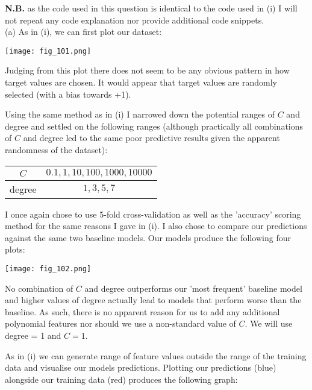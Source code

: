 \documentclass[12pt]{article}
\begin{document}
\textbf{N.B.} as the code used in this question is identical to the code used in (i) I will not repeat any code explanation nor provide additional code snippets. \\

\noindent (a) As in (i), we can first plot our dataset:

\begin{center}
    \texttt{[image: fig\_101.png]}
\end{center}

Judging from this plot there does not seem to be any obvious pattern in how target values are chosen. It would appear that target values are randomly selected (with a bias towards +1).

Using the same method as in (i) I narrowed down the potential ranges of $C$ and degree and settled on the following ranges (although practically all combinations of $C$ and degree led to the same poor predictive results given the apparent randomness of the dataset):

\begin{center}
    \begin{tabular}{|c|c|}
        \hline
        $C$ &  $0.1, 1, 10, 100, 1000, 10000$ \\ \hline
        degree & $1, 3, 5, 7$ \\ \hline
    \end{tabular}
\end{center}

I once again chose to use 5-fold cross-validation as well as the 'accuracy' scoring method for the same reasons I gave in (i). I also chose to compare our predictions against the same two baseline models. Our models produce the following four plots:

\begin{center}
    \texttt{[image: fig\_102.png]}
\end{center}

No combination of $C$ and degree outperforms our 'most frequent' baseline model and higher values of degree actually lead to models that perform worse than the baseline. As such, there is no apparent reason for us to add any additional polynomial features nor should we use a non-standard value of $C$. We will use degree = 1 and $C = 1$.

As in (i) we can generate range of feature values outside the range of the training data and visualise our models predictions. Plotting our predictions (blue) alongside our training data (red) produces the following graph:
\end{document}
